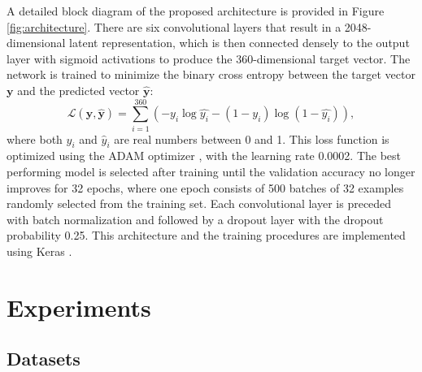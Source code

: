 A detailed block diagram of the proposed architecture is provided in Figure \ref{fig:architecture}.
There are six convolutional layers that result in a 2048-dimensional latent representation, which is then connected densely to the output layer with sigmoid activations to produce the 360-dimensional target vector.
The network is trained to minimize the binary cross entropy between the target vector $\mathbf{y}$ and the predicted vector $\hat{\mathbf{y}}$:
\begin{equation}
\mathcal{L}(\mathbf{y}, \hat{\mathbf{y}}) = \sum_{i=1}^{360} \left ( - y_i \log \hat{y_i} - (1 - y_i) \log (1 - \hat{y_i}) \right ),
\end{equation}
where both $y_i$ and $\hat{y}_i$ are real numbers between 0 and 1.
This loss function is optimized using the ADAM optimizer \cite{kingma2015adam}, with the learning rate 0.0002. 
The best performing model is selected after training until the validation accuracy no longer improves for 32 epochs, where one epoch consists of 500 batches of 32 examples randomly selected from the training set. 
Each convolutional layer is preceded with batch normalization \cite{ioffe2015batchnorm} and followed by a dropout layer \cite{srivastava2014dropout} with the dropout probability 0.25.
This architecture and the training procedures are implemented using Keras \cite{chollet2015keras}.




\section{Experiments}

\subsection{Datasets}

